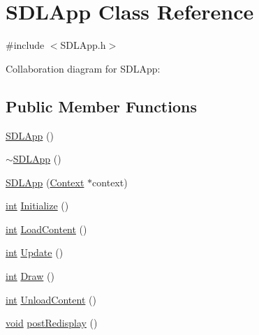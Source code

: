 \hypertarget{class_s_d_l_app}{\section{S\-D\-L\-App Class Reference}
\label{class_s_d_l_app}
}


{\ttfamily \#include $<$S\-D\-L\-App.\-h$>$}



Collaboration diagram for S\-D\-L\-App\-:
\subsection*{Public Member Functions}
\begin{DoxyCompactItemize}
\item 
\hyperlink{class_s_d_l_app_a160ce4b6494fb9d9da2ba9d056e94f47}{S\-D\-L\-App} ()
\item 
\hyperlink{class_s_d_l_app_aa7174ab70b36fd5269e84ea588eb95a4}{$\sim$\-S\-D\-L\-App} ()
\item 
\hyperlink{class_s_d_l_app_a8a8756b76b18735495570ba135ee307a}{S\-D\-L\-App} (\hyperlink{class_context}{Context} $\ast$context)
\item 
\hyperlink{_s_d_l__thread_8h_a6a64f9be4433e4de6e2f2f548cf3c08e}{int} \hyperlink{class_s_d_l_app_af083285e8c170a59aace8ab8f7097108}{Initialize} ()
\item 
\hyperlink{_s_d_l__thread_8h_a6a64f9be4433e4de6e2f2f548cf3c08e}{int} \hyperlink{class_s_d_l_app_a42702f8b658b4375930841ac7b56bea8}{Load\-Content} ()
\item 
\hyperlink{_s_d_l__thread_8h_a6a64f9be4433e4de6e2f2f548cf3c08e}{int} \hyperlink{class_s_d_l_app_a152eefe876d822eac0e902f57bf1b085}{Update} ()
\item 
\hyperlink{_s_d_l__thread_8h_a6a64f9be4433e4de6e2f2f548cf3c08e}{int} \hyperlink{class_s_d_l_app_a8abb80ce122c008ef22535cef684e766}{Draw} ()
\item 
\hyperlink{_s_d_l__thread_8h_a6a64f9be4433e4de6e2f2f548cf3c08e}{int} \hyperlink{class_s_d_l_app_a2e866b635344d3e2062d663e305a75f9}{Unload\-Content} ()
\item 
\hyperlink{_s_d_l__opengl_8h_a3db05964a3cc4410f35b7ea2b7eb850d}{void} \hyperlink{class_s_d_l_app_a0a8e090434266f004871fc851459bf48}{post\-Redisplay} ()
\end{DoxyCompactItemize}
